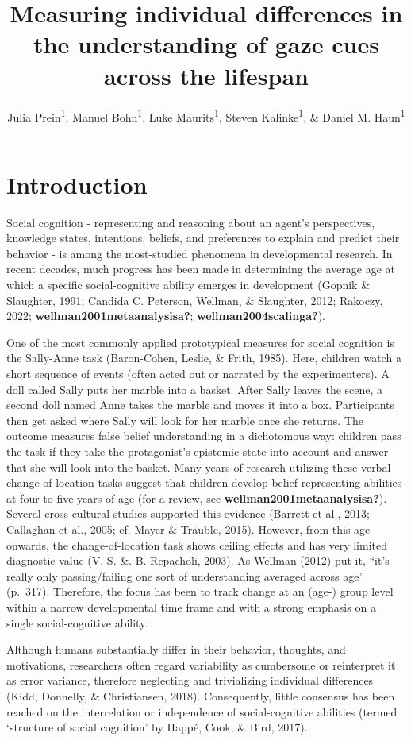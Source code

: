 \documentclass[
  man,floatsintext]{apa6}
\title{Measuring individual differences in the understanding of gaze cues across the lifespan}
\author{Julia Prein\textsuperscript{1}, Manuel Bohn\textsuperscript{1}, Luke Maurits\textsuperscript{1}, Steven Kalinke\textsuperscript{1}, \& Daniel M. Haun\textsuperscript{1}}
\date{}
\affiliation{\vspace{0.5cm}\textsuperscript{1} Department of Comparative Cultural Psychology, Max Planck Institute for Evolutionary Anthropology, Leipzig, Germany}
\begin{document}
\maketitle

\hypertarget{introduction}{%
\section{Introduction}\label{introduction}}

Social cognition - representing and reasoning about an agent's perspectives, knowledge states, intentions, beliefs, and preferences to explain and predict their behavior - is among the most-studied phenomena in developmental research.
In recent decades, much progress has been made in determining the average age at which a specific social-cognitive ability emerges in development (Gopnik \& Slaughter, 1991; Candida C. Peterson, Wellman, \& Slaughter, 2012; Rakoczy, 2022; \textbf{wellman2001metaanalysisa?}; \textbf{wellman2004scalinga?}).

One of the most commonly applied prototypical measures for social cognition is the Sally-Anne task (Baron-Cohen, Leslie, \& Frith, 1985).
Here, children watch a short sequence of events (often acted out or narrated by the experimenters).
A doll called Sally puts her marble into a basket.
After Sally leaves the scene, a second doll named Anne takes the marble and moves it into a box.
Participants then get asked where Sally will look for her marble once she returns.
The outcome measures false belief understanding in a dichotomous way:
children pass the task if they take the protagonist's epistemic state into account and answer that she will look into the basket.
Many years of research utilizing these verbal change-of-location tasks suggest that children develop belief-representing abilities at four to five years of age (for a review, see \textbf{wellman2001metaanalysisa?}).
Several cross-cultural studies supported this evidence (Barrett et al., 2013; Callaghan et al., 2005; cf. Mayer \& Träuble, 2015).
However, from this age onwards, the change-of-location task shows ceiling effects and has very limited diagnostic value (V. S. \&. B. Repacholi, 2003).
As Wellman (2012) put it, ``it's really only passing/failing one sort of understanding averaged across age'' (p.~317).
Therefore, the focus has been to track change at an (age-) group level within a narrow developmental time frame and with a strong emphasis on a single social-cognitive ability.

Although humans substantially differ in their behavior, thoughts, and motivations, researchers often regard variability as cumbersome or reinterpret it as error variance, therefore neglecting and trivializing individual differences (Kidd, Donnelly, \& Christiansen, 2018).
Consequently, little consensus has been reached on the interrelation or independence of social-cognitive abilities (termed `structure of social cognition' by Happé, Cook, \& Bird, 2017).
\end{document}
